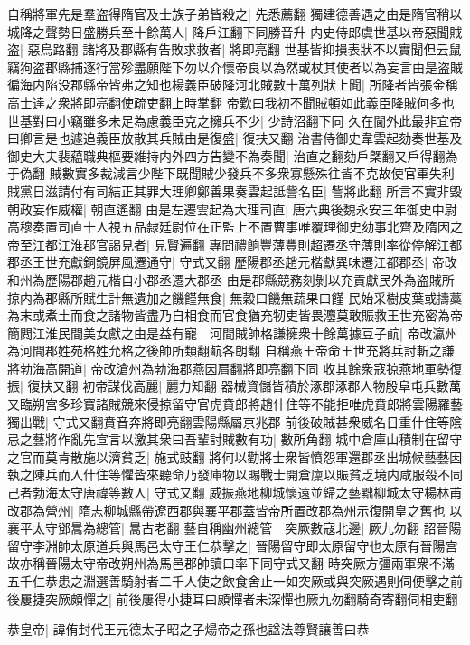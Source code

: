 自稱將軍先是羣盗得隋官及士族子弟皆殺之|{
	先悉薦翻}
獨建德善遇之由是隋官稍以城降之聲勢日盛勝兵至十餘萬人|{
	降戶江翻下同勝音升}
内史侍郎虞世基以帝惡聞賊盗|{
	惡烏路翻}
諸將及郡縣有告敗求救者|{
	將即亮翻}
世基皆抑損表狀不以實聞但云鼠竊狗盗郡縣捕逐行當殄盡願陛下勿以介懷帝良以為然或杖其使者以為妄言由是盗賊徧海内陷没郡縣帝皆弗之知也楊義臣破降河北賊數十萬列狀上聞|{
	所降者皆張金稱高士達之衆將即亮翻使疏吏翻上時掌翻}
帝歎曰我初不聞賊頓如此義臣降賊何多也世基對曰小竊雖多未足為慮義臣克之擁兵不少|{
	少詩沼翻下同}
久在閫外此最非宜帝曰卿言是也遽追義臣放散其兵賊由是復盛|{
	復扶又翻}
治書侍御史韋雲起劾奏世基及御史大夫裴藴職典樞要維持内外四方告變不為奏聞|{
	治直之翻劾戶槩翻又戶得翻為于偽翻}
賊數實多裁減言少陛下既聞賊少發兵不多衆寡懸殊往皆不克故使官軍失利賊黨日滋請付有司結正其罪大理卿鄭善果奏雲起詆訾名臣|{
	訾將此翻}
所言不實非毁朝政妄作威權|{
	朝直遙翻}
由是左遷雲起為大理司直|{
	唐六典後魏永安三年御史中尉高穆奏置司直十人視五品隸廷尉位在正監上不置曹事唯覆理御史劾事北齊及隋因之}
帝至江都江淮郡官謁見者|{
	見賢遍翻}
專問禮餉豐薄豐則超遷丞守薄則率從停解江都郡丞王世充獻銅鏡屏風遷通守|{
	守式又翻}
歷陽郡丞趙元楷獻異味遷江都郡丞|{
	帝改和州為歷陽郡趙元楷自小郡丞遷大郡丞}
由是郡縣競務刻剝以充貢獻民外為盗賊所掠内為郡縣所賦生計無遺加之饑饉無食|{
	無穀曰饑無蔬果曰饉}
民始采樹皮葉或擣藁為末或煮土而食之諸物皆盡乃自相食而官食猶充牣吏皆畏灋莫敢賑救王世充密為帝簡閲江淮民間美女獻之由是益有寵　河間賊帥格謙擁衆十餘萬據豆子䴚|{
	帝改瀛州為河間郡姓苑格姓允格之後帥所類翻䴚各朗翻}
自稱燕王帝命王世充將兵討斬之謙將勃海高開道|{
	帝改滄州為勃海郡燕因肩翻將即亮翻下同}
收其餘衆寇掠燕地軍勢復振|{
	復扶又翻}
初帝謀伐高麗|{
	麗力知翻}
器械資儲皆積於涿郡涿郡人物殷阜屯兵數萬又臨朔宫多珍寶諸賊競來侵掠留守官虎賁郎將趙什住等不能拒唯虎賁郎將雲陽羅藝獨出戰|{
	守式又翻賁音奔將即亮翻雲陽縣屬京兆郡}
前後破賊甚衆威名日重什住等隂忌之藝將作亂先宣言以激其衆曰吾輩討賊數有功|{
	數所角翻}
城中倉庫山積制在留守之官而莫肯散施以濟貧乏|{
	施式豉翻}
將何以勸將士衆皆憤怨軍還郡丞出城候藝藝因執之陳兵而入什住等懼皆來聽命乃發庫物以賜戰士開倉廩以賑貧乏境内咸服殺不同己者勃海太守唐禕等數人|{
	守式又翻}
威振燕地柳城懷遠並歸之藝黜柳城太守楊林甫改郡為營州|{
	隋志柳城縣帶遼西郡與襄平郡蓋皆帝所置改郡為州示復開皇之舊也}
以襄平太守鄧暠為總管|{
	暠古老翻}
藝自稱幽州總管　突厥數寇北邊|{
	厥九勿翻}
詔晉陽留守李淵帥太原道兵與馬邑太守王仁恭擊之|{
	晉陽留守即太原留守也太原有晉陽宫故亦稱晉陽太守帝改朔州為馬邑郡帥讀曰率下同守式又翻}
時突厥方彊兩軍衆不滿五千仁恭患之淵選善騎射者二千人使之飲食舍止一如突厥或與突厥遇則伺便擊之前後屢捷突厥頗憚之|{
	前後屢得小捷耳曰頗憚者未深憚也厥九勿翻騎奇寄翻伺相吏翻}


恭皇帝|{
	諱侑封代王元德太子昭之子煬帝之孫也諡法尊賢讓善曰恭}


